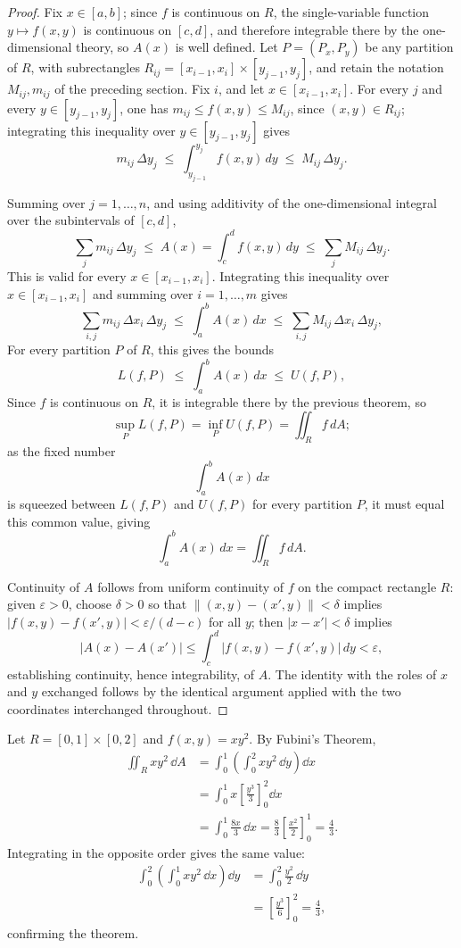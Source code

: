 \begin{proof}
Fix $x \in [a,b]$; since $f$ is continuous on $R$, the single-variable function $y \mapsto f(x,y)$ is continuous on $[c,d]$, and therefore integrable there by the one-dimensional theory, so $A(x)$ is well defined. Let $P = (P_x,P_y)$ be any partition of $R$, with subrectangles $R_{ij} = [x_{i-1},x_i]\times[y_{j-1},y_j]$, and retain the notation $M_{ij}, m_{ij}$ of the preceding section. Fix $i$, and let $x \in [x_{i-1},x_i]$. For every $j$ and every $y \in [y_{j-1},y_j]$, one has $m_{ij} \leq f(x,y) \leq M_{ij}$, since $(x,y) \in R_{ij}$; integrating this inequality over $y \in [y_{j-1},y_j]$ gives
\[
m_{ij}\,\Delta y_j \;\leq\; \int_{y_{j-1}}^{y_j} f(x,y)\, dy \;\leq\; M_{ij}\,\Delta y_j.
\]

Summing over $j = 1, \dots, n$, and using additivity of the one-dimensional integral over the subintervals of $[c,d]$,
\[
\sum_{j} m_{ij}\,\Delta y_j \;\leq\; A(x) = \int_c^d f(x,y)\, dy \;\leq\; \sum_j M_{ij}\, \Delta y_j.
\]
This is valid for every $x \in [x_{i-1},x_i]$. Integrating this inequality over $x \in [x_{i-1},x_i]$ and summing over $i = 1, \dots, m$ gives
\[
\sum_{i,j} m_{ij}\, \Delta x_i \, \Delta y_j \;\leq\; \int_a^b A(x)\, dx \;\leq\; \sum_{i,j} M_{ij}\,\Delta x_i\, \Delta y_j,
\]
For every partition $P$ of $R$, this gives the bounds
\[
L(f,P) \;\leq\; \int_a^b A(x)\, dx \;\leq\; U(f,P),
\]
Since $f$ is continuous on $R$, it is integrable there by the previous theorem, so \[
\sup_P L(f,P) = \inf_P U(f,P) = \iint_R f\, dA;
\] as the fixed number \[
\int_a^b A(x)\, dx
\] is squeezed between $L(f,P)$ and $U(f,P)$ for every partition $P$, it must equal this common value, giving
\[
\int_a^b A(x)\, dx = \iint_R f\, dA.
\]

Continuity of $A$ follows from uniform continuity of $f$ on the compact rectangle $R$: given $\varepsilon>0$, choose $\delta>0$ so that $\|(x,y)-(x',y)\|<\delta$ implies $|f(x,y)-f(x',y)| < \varepsilon/(d-c)$ for all $y$; then $|x-x'|<\delta$ implies \[
|A(x)-A(x')| \leq \int_c^d |f(x,y)-f(x',y)|\, dy < \varepsilon,
\] establishing continuity, hence integrability, of $A$. The identity with the roles of $x$ and $y$ exchanged follows by the identical argument applied with the two coordinates interchanged throughout.
\end{proof}

\begin{example}
Let $R = [0,1]\times[0,2]$ and $f(x,y) = xy^2$. By Fubini's Theorem,
\begin{align*}
\iint_R xy^2\,\dd A
&= \int_0^1 \left(\int_0^2 xy^2\,\dd y\right)\dd x \\
&= \int_0^1 x\left[\frac{y^3}{3}\right]_{0}^{2}\dd x \\
&= \int_0^1 \frac{8x}{3}\,\dd x
= \frac{8}{3}\left[\frac{x^2}{2}\right]_{0}^{1}
= \frac{4}{3}.
\end{align*}
Integrating in the opposite order gives the same value:
\begin{align*}
\int_0^2\left(\int_0^1 xy^2\,\dd x\right)\dd y
&= \int_0^2 \frac{y^2}{2}\,\dd y \\
&= \left[\frac{y^3}{6}\right]_{0}^{2}
= \frac{4}{3},
\end{align*}
confirming the theorem.
\end{example}

